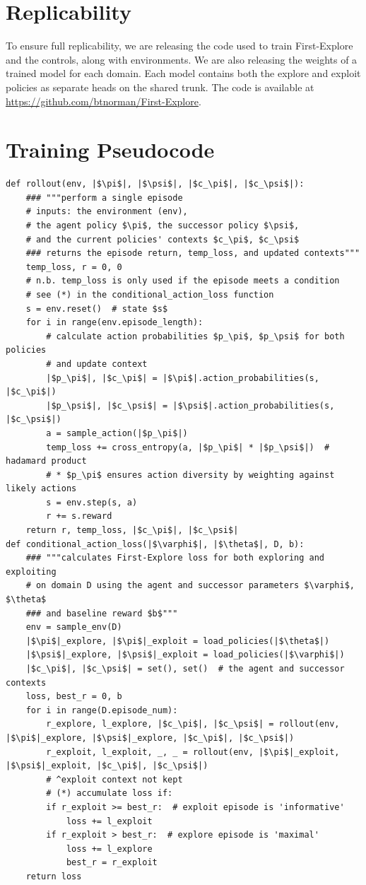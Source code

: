 \documentclass{article}
\begin{document}
\section{Replicability}
To ensure full replicability, we are releasing the code used to train First-Explore and the controls, along with environments. We are also releasing the weights of a trained model for each domain. Each model contains both the explore and
exploit policies as separate heads on the shared trunk. The code is available at \url{https://github.com/btnorman/First-Explore}.
\section{Training Pseudocode}
\label{pseudo}
\renewcommand{\listingscaption}{Algorithm}
\begin{listing}[h]
\begin{verbatim}
def rollout(env, |$\pi$|, |$\psi$|, |$c_\pi$|, |$c_\psi$|):
    ### """perform a single episode
    # inputs: the environment (env),
    # the agent policy $\pi$, the successor policy $\psi$,
    # and the current policies' contexts $c_\pi$, $c_\psi$
    ### returns the episode return, temp_loss, and updated contexts"""
    temp_loss, r = 0, 0
    # n.b. temp_loss is only used if the episode meets a condition
    # see (*) in the conditional_action_loss function
    s = env.reset()  # state $s$
    for i in range(env.episode_length):
        # calculate action probabilities $p_\pi$, $p_\psi$ for both policies
        # and update context
        |$p_\pi$|, |$c_\pi$| = |$\pi$|.action_probabilities(s, |$c_\pi$|)
        |$p_\psi$|, |$c_\psi$| = |$\psi$|.action_probabilities(s, |$c_\psi$|)
        a = sample_action(|$p_\pi$|)
        temp_loss += cross_entropy(a, |$p_\pi$| * |$p_\psi$|)  # hadamard product
        # * $p_\pi$ ensures action diversity by weighting against likely actions
        s = env.step(s, a)
        r += s.reward
    return r, temp_loss, |$c_\pi$|, |$c_\psi$|
def conditional_action_loss(|$\varphi$|, |$\theta$|, D, b):
    ### """calculates First-Explore loss for both exploring and exploiting
    # on domain D using the agent and successor parameters $\varphi$, $\theta$
    ### and baseline reward $b$"""
    env = sample_env(D)
    |$\pi$|_explore, |$\pi$|_exploit = load_policies(|$\theta$|)
    |$\psi$|_explore, |$\psi$|_exploit = load_policies(|$\varphi$|)
    |$c_\pi$|, |$c_\psi$| = set(), set()  # the agent and successor contexts
    loss, best_r = 0, b
    for i in range(D.episode_num):
        r_explore, l_explore, |$c_\pi$|, |$c_\psi$| = rollout(env, |$\pi$|_explore, |$\psi$|_explore, |$c_\pi$|, |$c_\psi$|)
        r_exploit, l_exploit, _, _ = rollout(env, |$\pi$|_exploit, |$\psi$|_exploit, |$c_\pi$|, |$c_\psi$|)
        # ^exploit context not kept
        # (*) accumulate loss if:
        if r_exploit >= best_r:  # exploit episode is 'informative'
            loss += l_exploit
        if r_exploit > best_r:  # explore episode is 'maximal'
            loss += l_explore
            best_r = r_exploit
    return loss
\end{verbatim}
\caption{Example First-Explore Cross-Entropy Loss.}
\label{listing:trainfe1}
\end{listing}
\end{document}
